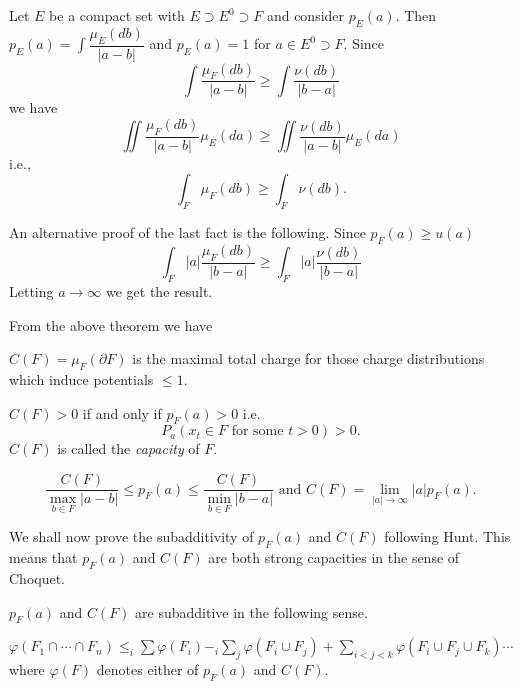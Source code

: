 Let $E$ be a compact set with $E \supset E^0 \supset F$ and consider
$p_E(a)$. Then $p_E(a) = \int \dfrac{\mu_E (db)}{|a - b|}$ and $p_E(a)
= 1$ for $a \in E^0 \supset F$. Since 
$$
\int \frac{\mu_F (db)}{|a - b|} \geq \int \frac{\nu (db)}{|b -
    a|}
$$
we have
$$
\iint \frac{\mu_F (db)}{|a - b|} \mu_E (da) \geq \iint \frac{\nu
    (db)}{|a - b|} \mu_E (da)
$$
i.e.,\pageoriginale
$$
\int_F \mu_F (db) \geq \int_F \nu (db).
$$

An alternative proof of the last fact is the following. Since $p_F(a)
\geq u(a)$ 
$$
\int_F |a| \frac{\mu_F (db)}{|b - a|} \geq \int_F |a| \frac{\nu
  (db)}{|b - a|} 
$$
Letting $a \rightarrow \infty$ we get the result.	

From the above theorem we have
\begin{thm}\label{chap3-sec6-thm3}%
  $C(F) = \mu_F (\partial F)$ is the maximal total charge for those
  charge distributions which induce potentials $\le 1$. 
\end{thm}

\begin{thm}[Kakutani]\label{chap3-sec6-thm4}%
  $C (F) > 0$ if and only if $p_F(a) > 0$ i.e.
  $$
  P_a (x_t \in F \text{ for some } t > 0) > 0.
  $$
  $C(F)$ is called the \textit{ capacity } of $F$.
\end{thm}

\begin{thm}\label{chap3-sec6-thm5} %
  $$
  \frac{C(F)} {\max \limits_{b \in F} |a - b|} \leq p_F (a) \leq
  \frac{C(F)} {\min \limits_{b \in F} |b - a|} \text{ and } C(F) =
  \lim_{|a| \rightarrow \infty} |a| p_F (a). 
  $$
\end{thm}

We shall now prove the subadditivity of $p_F(a)$ and $C(F)$ following
Hunt. This means that $p_F(a)$ and $C(F)$ are both strong capacities
in the sense of Choquet. 

\begin{thm}\label{chap3-sec6-thm6} %
  $p_F(a)$ and $C(F)$ are subadditive in the following sense.
  
  $\varphi (F_1 \cap \cdots \cap F_n) \leq_i \sum \varphi (F_i) - _i
  \sum_ j \varphi (F_i \cup F_j) + \sum \limits_{i < j < k} \varphi
  (F_i \cup F_j \cup F_k)\cdots$ where $\varphi(F)$ denotes either of
  $p_F(a)$ and $C(F)$. 
\end{thm}

